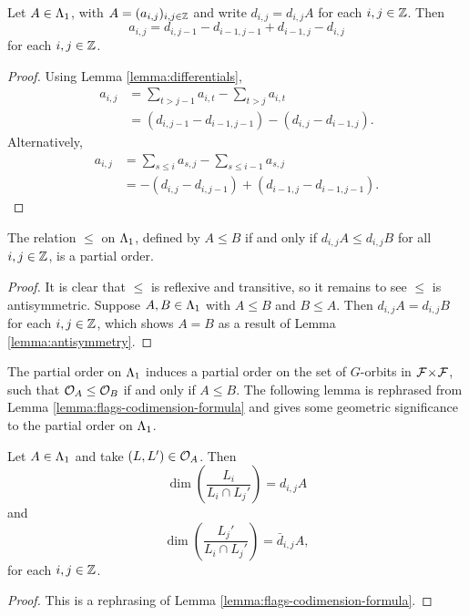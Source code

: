 \documentclass[a4paper, 11pt]{report}
\begin{document}
\begin{lemma}\label{lemma:antisymmetry}
Let $A\in{\Lambda_1}$, with $A = (a_{i,j})_{i,j\in\mathbb{Z}}$ and write $d_{i,j}=d_{i,j}A$ for each $i,j\in\mathbb{Z}$. Then
\begin{equation*}
a_{i,j} = d_{i,j-1} - d_{i-1,j-1} + d_{i-1,j} - d_{i,j}
\end{equation*}
for each $i,j\in\mathbb{Z}$.
\end{lemma}
\begin{proof}
Using Lemma \ref{lemma:differentials},
\begin{align*}
a_{i,j}
&= \sum_{t>j-1}a_{i,t} - \sum_{t>j}a_{i,t}\\
&= (d_{i,j-1} - d_{i-1,j-1}) - (d_{i,j} - d_{i-1,j}).
\end{align*}
Alternatively,
\begin{align*}
a_{i,j}
&= \sum_{s\le i}a_{s,j} - \sum_{s\le i-1}a_{s,j}\\
&= -(d_{i,j}-d_{i,j-1}) + (d_{i-1,j} - d_{i-1,j-1}).
\end{align*}
\end{proof}

\begin{lemma}\label{lemma:orbit-poset}
The relation $\le$ on ${\Lambda_1}$, defined by $A\le B$ if and only if $d_{i,j}A\le d_{i,j}B$ for all $i,j\in\mathbb{Z}$, is a partial order.
\end{lemma}

\begin{proof}
It is clear that $\le$ is reflexive and transitive, so it remains to see $\le$ is antisymmetric. Suppose $A,B\in{\Lambda_1}$ with $A\le B$ and $B\le A$. Then $d_{i,j}A = d_{i,j}B$ for each $i,j\in\mathbb{Z}$, which shows $A=B$ as a result of Lemma \ref{lemma:antisymmetry}.  
\end{proof}

The partial order on ${\Lambda_1}$ induces a partial order on the set of $G$-orbits in ${\mathcal{F}\!\times\!\mathcal{F}}$, such that $\mathcal{O}_{A}\le \mathcal{O}_{B}$ if and only if $A\le B$. The following lemma is rephrased from Lemma \ref{lemma:flags-codimension-formula} and gives some geometric significance to the partial order on ${\Lambda_1}$.

\begin{lemma}\label{lemma:codimension-fomula-corner-sums}
Let $A\in{\Lambda_1}$ and take $(L,L')\in\mathcal{O}_{A}$. Then
\begin{equation*}
\dim\left(\frac{L_i}{L_i\cap L_j'}\right) = d_{i,j}{A}
\end{equation*}
and
\begin{equation*}
\dim\left(\frac{L_j'}{L_i\cap L_j'}\right) = \bar{d}_{i,j}{A},
\end{equation*}
for each $i,j\in\mathbb{Z}$.
\end{lemma}
\begin{proof}
This is a rephrasing of Lemma \ref{lemma:flags-codimension-formula}.
\end{proof}
\end{document}

